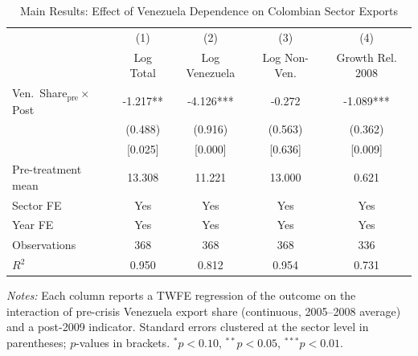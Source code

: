 \begin{table}[!htbp]
\centering
\begin{threeparttable}
\caption{Main Results: Effect of Venezuela Dependence on Colombian Sector Exports}
\label{tab:main}
\small
\begin{tabular}{lcccc}
\toprule
 & (1) & (2) & (3) & (4) \\
 & Log Total & Log Venezuela & Log Non-Ven. & Growth Rel. 2008 \\
\midrule
Ven.\ Share$_{\text{pre}} \times$ Post & -1.217** & -4.126*** & -0.272 & -1.089*** \\
  & (0.488) & (0.916) & (0.563) & (0.362) \\
  & [0.025] & [0.000] & [0.636] & [0.009] \\
\addlinespace
Pre-treatment mean & 13.308 & 11.221 & 13.000 & 0.621 \\
Sector FE & Yes & Yes & Yes & Yes \\
Year FE & Yes & Yes & Yes & Yes \\
Observations & 368 & 368 & 368 & 336 \\
$R^2$ & 0.950 & 0.812 & 0.954 & 0.731 \\
\bottomrule
\end{tabular}
\begin{tablenotes}[flushleft]\footnotesize
\item \textit{Notes:} Each column reports a TWFE regression of the outcome on the interaction of pre-crisis Venezuela export share (continuous, 2005--2008 average) and a post-2009 indicator. Standard errors clustered at the sector level in parentheses; $p$-values in brackets. $^{*}p<0.10$, $^{**}p<0.05$, $^{***}p<0.01$.
\end{tablenotes}
\end{threeparttable}
\end{table}
